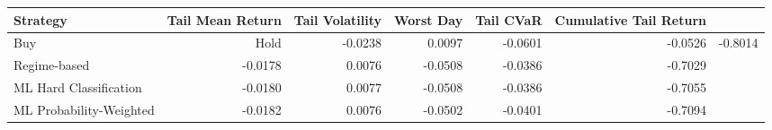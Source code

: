\begin{tabular}{lrrrrr}
\toprule
Strategy & Tail Mean Return & Tail Volatility & Worst Day & Tail CVaR & Cumulative Tail Return \\
\midrule
Buy & Hold & -0.0238 & 0.0097 & -0.0601 & -0.0526 & -0.8014 \\
Regime-based & -0.0178 & 0.0076 & -0.0508 & -0.0386 & -0.7029 \\
ML Hard Classification & -0.0180 & 0.0077 & -0.0508 & -0.0386 & -0.7055 \\
ML Probability-Weighted & -0.0182 & 0.0076 & -0.0502 & -0.0401 & -0.7094 \\
\bottomrule
\end{tabular}
